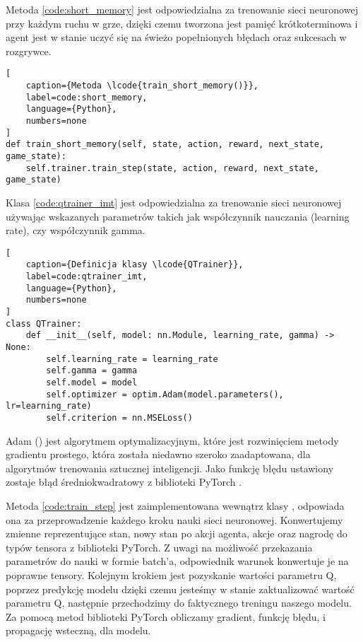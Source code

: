 Metoda  \ref{code:short_memory} jest odpowiedzialna za trenowanie sieci neuronowej przy każdym ruchu w grze, dzięki czemu tworzona jest pamięć krótkoterminowa i agent jest w stanie uczyć się na świeżo popełnionych błędach oraz sukcesach w rozgrywce.

\begin{onepage}
    \begin{lstlisting}[
    caption={Metoda \lcode{train_short_memory()}},
    label=code:short_memory,
    language={Python},
    numbers=none
]
def train_short_memory(self, state, action, reward, next_state, game_state):
    self.trainer.train_step(state, action, reward, next_state, game_state)

    \end{lstlisting}
\end{onepage}

Klasa  \ref{code:qtrainer_imt} jest odpowiedzialna za trenowanie sieci neuronowej używając wskazanych parametrów takich jak współczynnik nauczania (learning rate), czy współczynnik gamma.

\begin{onepage}
    \begin{lstlisting}[
    caption={Definicja klasy \lcode{QTrainer}},
    label=code:qtrainer_imt,
    language={Python},
    numbers=none
]
class QTrainer:
    def __init__(self, model: nn.Module, learning_rate, gamma) -> None:
        self.learning_rate = learning_rate
        self.gamma = gamma
        self.model = model
        self.optimizer = optim.Adam(model.parameters(), lr=learning_rate)
        self.criterion = nn.MSELoss()
    \end{lstlisting}
\end{onepage}


Adam () \cite{AdamOpt1} \cite{AdamOpt2} jest algorytmem optymalizacyjnym, które jest rozwinięciem metody gradientu prostego, która została niedawno szeroko zaadaptowana, dla algorytmów trenowania sztucznej inteligencji. Jako funkcję błędu ustawiony zostaje błąd średniokwadratowy z biblioteki PyTorch .

\clearpage

Metoda  \ref{code:train_step} jest zaimplementowana wewnątrz klasy , odpowiada ona za przeprowadzenie każdego kroku nauki sieci neuronowej. Konwertujemy zmienne reprezentujące stan, nowy stan po akcji agenta, akcje oraz nagrodę do typów tensora z biblioteki PyTorch. Z uwagi na możliwość przekazania parametrów do nauki w formie batch'a, odpowiednik warunek konwertuje je na poprawne tensory. Kolejnym krokiem jest pozyskanie wartości parametru Q, poprzez predykcję modelu dzięki czemu jesteśmy w stanie zaktualizować wartość parametru Q, następnie przechodzimy do faktycznego treningu naszego modelu. Za pomocą metod biblioteki PyTorch obliczamy gradient, funkcję błędu, i propagację wsteczną, dla modelu.

